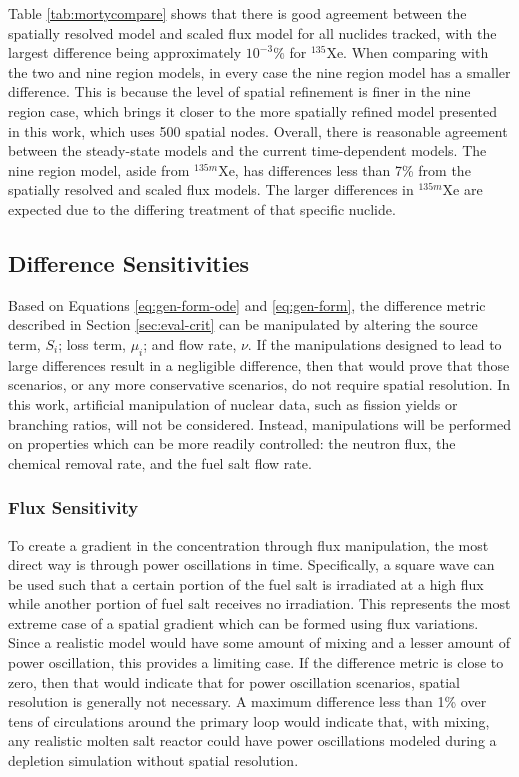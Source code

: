 \documentclass{style/nseJournal}
\begin{document}
Table \ref{tab:mortycompare} shows that there is good agreement between the spatially resolved model and scaled flux model for all nuclides tracked, with the largest difference being approximately $10^{-3}\%$ for $^{135}$Xe.
When comparing with the two and nine region models, in every case the nine region model has a smaller difference.
This is because the level of spatial refinement is finer in the nine region case, which brings it closer to the more spatially refined model presented in this work, which uses 500 spatial nodes.
Overall, there is reasonable agreement between the steady-state models and the current time-dependent models.
The nine region model, aside from $^{135m}$Xe, has differences less than 7\% from the spatially resolved and scaled flux models.
The larger differences in $^{135m}$Xe are expected due to the differing treatment of that specific nuclide.


\subsection{Difference Sensitivities}
\label{sec:diffsens}

Based on Equations \eqref{eq:gen-form-ode} and \eqref{eq:gen-form}, the difference metric described in Section \ref{sec:eval-crit} can be manipulated by altering the source term, $S_i$; loss term, $\mu_i$; and flow rate, $\nu$.
If the manipulations designed to lead to large differences result in a negligible difference, then that would prove that those scenarios, or any more conservative scenarios, do not require spatial resolution.
In this work, artificial manipulation of nuclear data, such as fission yields or branching ratios, will not be considered.
Instead, manipulations will be performed on properties which can be more readily controlled: the neutron flux, the chemical removal rate, and the fuel salt flow rate.
\FloatBarrier

\subsubsection{Flux Sensitivity}

To create a gradient in the concentration through flux manipulation, the most direct way is through power oscillations in time.
Specifically, a square wave can be used such that a certain portion of the fuel salt is irradiated at a high flux while another portion of fuel salt receives no irradiation.
This represents the most extreme case of a spatial gradient which can be formed using flux variations.
Since a realistic model would have some amount of mixing and a lesser amount of power oscillation, this provides a limiting case.
If the difference metric is close to zero, then that would indicate that for power oscillation scenarios, spatial resolution is generally not necessary.
A maximum difference less than 1\% over tens of circulations around the primary loop would indicate that, with mixing, any realistic molten salt reactor could have power oscillations modeled during a depletion simulation without spatial resolution.
\end{document}
